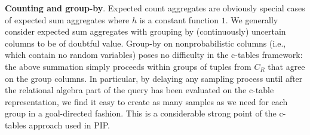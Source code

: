 {\bf Counting and group-by}\/.
Expected count aggregates are obviously special cases of expected sum
aggregates where $h$ is a constant function $1$.
We generally consider expected sum aggregates with grouping by (continuously)
uncertain columns to be of doubtful value.
Group-by on nonprobabilistic columns (i.e., which contain no random variables)
poses no difficulty in the c-tables framework: the above summation simply
proceeds within groups of tuples from $C_R$ that agree on the group columns.
In particular, by delaying any sampling process until after the relational
algebra part of the query has been evaluated on the c-table representation,
we find it easy to create as many samples as we need for each group in a 
goal-directed fashion. This is a considerable strong point of the c-tables
approach used in PIP.


